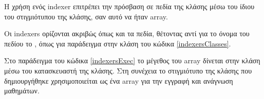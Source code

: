 Η χρήση ενός indexer επιτρέπει την πρόσβαση σε πεδία της κλάσης μέσω του ίδιου του στιγμιότυπου της κλάσης, σαν αυτό να ήταν array.



Οι indexers ορίζονται ακριβώς όπως και τα πεδία, θέτοντας αντί για το όνομα του πεδίου το , όπως για παράδειγμα στην κλάση του κώδικα \ref{indexersClasses}.

Στο παράδειγμα του κώδικα \ref{indexersExec} το μέγεθος του array δίνεται στην κλάση μέσω του κατασκευαστή της κλάσης. Στη συνέχεια το στιγμιότυπο της κλάσης που δημιουργήθηκε χρησιμοποιείται ως ένα array για την εγγραφή και ανάγνωση μαθημάτων.


